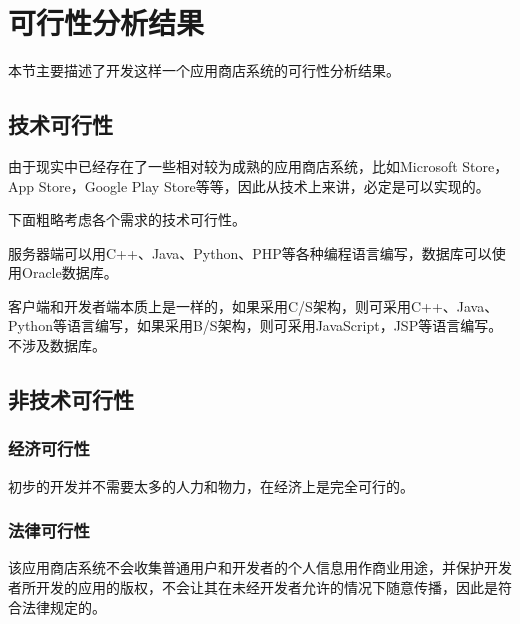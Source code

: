 \chapter{可行性分析结果}
本节主要描述了开发这样一个应用商店系统的可行性分析结果。

\section{技术可行性}
由于现实中已经存在了一些相对较为成熟的应用商店系统，比如Microsoft Store，App Store，Google Play Store等等，因此从技术上来讲，必定是可以实现的。

下面粗略考虑各个需求的技术可行性。

服务器端可以用C++、Java、Python、PHP等各种编程语言编写，数据库可以使用Oracle数据库。

客户端和开发者端本质上是一样的，如果采用C/S架构，则可采用C++、Java、Python等语言编写，如果采用B/S架构，则可采用JavaScript，JSP等语言编写。不涉及数据库。

\section{非技术可行性}
\subsection{经济可行性}
初步的开发并不需要太多的人力和物力，在经济上是完全可行的。
\subsection{法律可行性}
该应用商店系统不会收集普通用户和开发者的个人信息用作商业用途，并保护开发者所开发的应用的版权，不会让其在未经开发者允许的情况下随意传播，因此是符合法律规定的。
